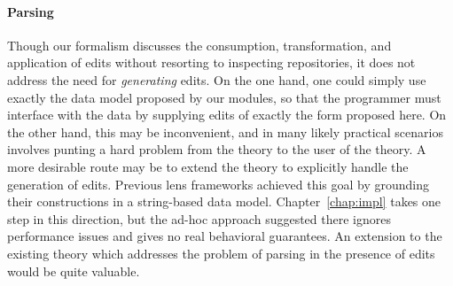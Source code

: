\paragraph*{Parsing}
Though our formalism discusses the consumption, transformation, and
application of edits without resorting to inspecting repositories, it does
not address the need for \emph{generating} edits. On the one hand, one could
simply use exactly the data model proposed by our modules, so that the
programmer must interface with the data by supplying edits of exactly the
form proposed here. On the other hand, this may be inconvenient, and in many
likely practical scenarios involves punting a hard problem from the theory
to the user of the theory. A more desirable route may be to extend the
theory to explicitly handle the generation of edits. Previous lens
frameworks achieved this goal by grounding their constructions in a
string-based data model. Chapter~\ref{chap:impl} takes one step in this
direction, but the ad-hoc approach suggested there ignores performance
issues and gives no real behavioral guarantees. An extension to the existing
theory which addresses the problem of parsing in the presence of edits would
be quite valuable.

